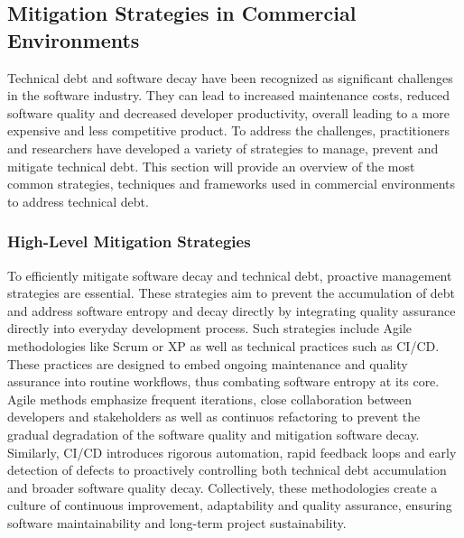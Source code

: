 \subsection{Mitigation Strategies in Commercial Environments}
Technical debt and software decay have been recognized as significant challenges in the software industry. They can lead to 
increased maintenance costs, reduced software quality and decreased developer productivity, overall leading to a more expensive and less competitive product.
To address the challenges, practitioners and researchers have developed a variety of strategies to manage, prevent and mitigate technical debt.
This section will provide an overview of the most common strategies, techniques and frameworks used in commercial environments to address technical debt.\\

\subsubsection{High-Level Mitigation Strategies}
To efficiently mitigate software decay and technical debt, proactive management strategies are essential. These strategies aim to prevent the accumulation of 
debt and address software entropy and decay directly by integrating quality assurance directly into everyday development process.
Such strategies include Agile methodologies like Scrum or \ac{XP} as well as technical practices
such as \ac{CI/CD}. These practices are designed to embed ongoing maintenance and quality assurance into routine workflows, thus combating software entropy at its core.\\
Agile methods emphasize frequent iterations, close collaboration between developers and stakeholders as well as continuos refactoring to prevent the
gradual degradation of the software quality and mitigation software decay.\\
Similarly, \ac{CI/CD} introduces rigorous automation, rapid feedback loops and early detection of defects to proactively controlling both technical debt accumulation
and broader software quality decay. Collectively, these methodologies create a culture of continuous improvement, adaptability and quality assurance, 
ensuring software maintainability and long-term project sustainability.\\
